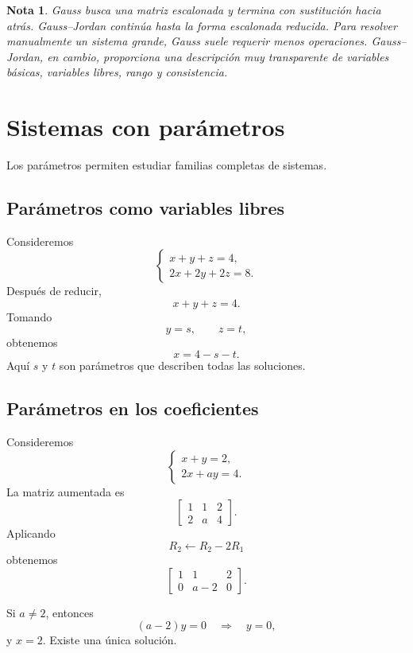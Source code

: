\documentclass[12pt]{article}
\newtheorem{Nota}[definicion]{Nota}
\theoremstyle{remark}
\begin{document}
\begin{Nota}

Gauss busca una matriz escalonada y termina con sustitución hacia atrás. Gauss--Jordan continúa hasta la forma escalonada reducida. Para resolver manualmente un sistema grande, Gauss suele requerir menos operaciones. Gauss--Jordan, en cambio, proporciona una descripción muy transparente de variables básicas, variables libres, rango y consistencia.
\end{Nota}
\section{Sistemas con parámetros}
Los parámetros permiten estudiar familias completas de sistemas.

\subsection*{Parámetros como variables libres}
Consideremos
\[
\begin{cases}
x+y+z=4,\\
2x+2y+2z=8.
\end{cases}
\]
Después de reducir,
\[
x+y+z=4.
\]
Tomando
\[
y=s,\qquad z=t,
\]
obtenemos
\[
x=4-s-t.
\]
Aquí $s$ y $t$ son parámetros que describen todas las soluciones.
\subsection*{Parámetros en los coeficientes}
Consideremos
\[
\begin{cases}
x+y=2,\\
2x+ay=4.
\end{cases}
\]
La matriz aumentada es
\[
\left[
\begin{array}{cc|c}
1&1&2\\
2&a&4
\end{array}
\right].
\]
Aplicando
\[
R_2\leftarrow R_2-2R_1
\]
obtenemos
\[
\left[
\begin{array}{cc|c}
1&1&2\\
0&a-2&0
\end{array}
\right].
\]

Si $a\neq2$, entonces
\[
(a-2)y=0\quad\Longrightarrow\quad y=0,
\]
y $x=2$. Existe una única solución.
\end{document}
